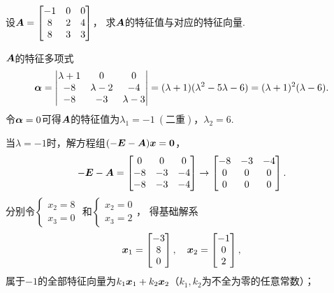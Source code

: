 \begin{example}
设\(\boldsymbol{A} = \begin{bmatrix} -1 & 0 & 0 \\ 8 & 2 & 4 \\ 8 & 3 & 3 \end{bmatrix}\)，
求\(\boldsymbol{A}\)的特征值与对应的特征向量.
\begin{solution}
\(\boldsymbol{A}\)的特征多项式\[
	\boldsymbol\alpha = \begin{vmatrix}
		\lambda+1 & 0 & 0 \\
		-8 & \lambda-2 & -4 \\
		-8 & -3 & \lambda-3
	\end{vmatrix}
	= (\lambda+1)(\lambda^2-5\lambda-6)
	= (\lambda+1)^2(\lambda-6).
\]
令\(\boldsymbol\alpha = 0\)可得\(\boldsymbol{A}\)的特征值为\(\lambda_1=-1\ (\text{二重})\)，\(\lambda_2=6\).

当\(\lambda=-1\)时，解方程组\((-\boldsymbol{E}-\boldsymbol{A})\boldsymbol{x}=\boldsymbol0\)，\[
	-\boldsymbol{E}-\boldsymbol{A}
	= \begin{bmatrix} 0 & 0 & 0 \\ -8 & -3 & -4 \\ -8 & -3 & -4 \end{bmatrix}
	\to \begin{bmatrix} -8 & -3 & -4 \\ 0 & 0 & 0 \\ 0 & 0 & 0 \end{bmatrix}.
\]
分别令\(\left\{ \begin{array}{l} x_2=8 \\ x_3=0 \end{array} \right.\)
和\(\left\{ \begin{array}{l} x_2=0 \\ x_3=2 \end{array} \right.\)，
得基础解系\[
	\boldsymbol{x}_1 = \begin{bmatrix} -3 \\ 8 \\ 0 \end{bmatrix},
	\quad
	\boldsymbol{x}_2 = \begin{bmatrix} -1 \\ 0 \\ 2 \end{bmatrix},
\]
属于\(-1\)的全部特征向量为\(k_1\boldsymbol{x}_1+k_2\boldsymbol{x}_2\)（\(k_1,k_2\)为不全为零的任意常数）；


\end{solution}
\end{example}
